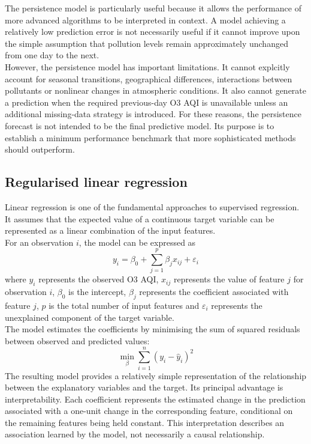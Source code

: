 \documentclass[11pt,a4paper]{article}
\begin{document}
\noindent
The persistence model is particularly useful because it allows the performance of more advanced algorithms to be interpreted in context. A model achieving a relatively low prediction error is not necessarily useful if it cannot improve upon the simple assumption that pollution levels remain approximately unchanged from one day to the next.\\

\noindent
However, the persistence model has important limitations. It cannot explcitly account for seasonal transitions, geographical differences, interactions between pollutants or nonlinear changes in atmospheric conditions. It also cannot generate a prediction when the required previous-day O3 AQI is unavailable unless an additional missing-data strategy is introduced. For these reasons, the persistence forecast is not intended to be the final predictive model. Its purpose is to establish a minimum performance benchmark that more sophisticated methods should outperform.\\

\subsection{Regularised linear regression}
Linear regression is one of the fundamental approaches to supervised regression. It assumes that the expected value of a continuous target variable can be represented as a linear combination of the input features.\\

\noindent
For an observation $i$, the model can be expressed as
\begin{equation}
    y_i=\beta_0+\sum_{j=1}^p\beta_jx_{ij}+\varepsilon_i
\end{equation}
where $y_i$ represents the observed O3 AQI, $x_{ij}$ represents the value of feature $j$ for observation $i$, $\beta_0$ is the intercept, $\beta_j$ represents the coefficient associated with feature $j$, $p$ is the total number of input features and $\varepsilon_i$ represents the unexplained component of the target variable.\\

\noindent
The model estimates the coefficients by minimising the sum of squared residuals between observed and predicted values:
\begin{equation}
    \min_\beta\sum_{i=1}^n(y_i-\hat{y}_i)^2
\end{equation}
\noindent
The resulting model provides a relatively simple representation of the relationship between the explanatory variables and the target. Its principal advantage is interpretability. Each coefficient represents the estimated change in the prediction associated with a one-unit change in the corresponding feature, conditional on the remaining features being held constant. This interpretation describes an association learned by the model, not necessarily a causal relationship.\\
\end{document}
